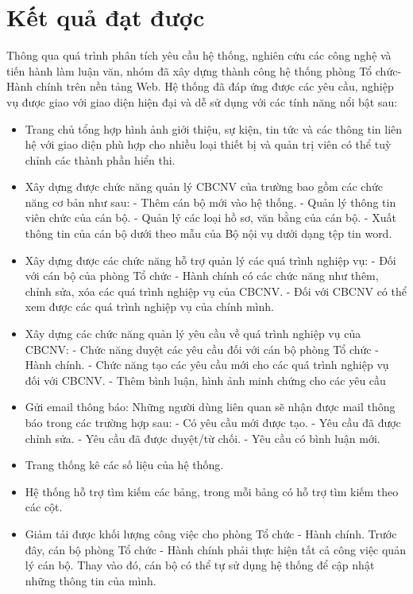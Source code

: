 \section{Kết quả đạt được}
Thông qua quá trình phân tích yêu cầu hệ thống, nghiên cứu các công nghệ và tiến hành làm luận văn, nhóm đã xây dựng thành công hệ thống phòng Tổ chức-Hành chính trên nền tảng Web. Hệ thống đã đáp ứng được các yêu cầu, nghiệp vụ được giao với giao diện hiện đại và dễ sử dụng với các tính năng nổi bật sau:
\begin{itemize}
    \item Trang chủ tổng hợp hình ảnh giới thiệu, sự kiện, tin tức và các thông tin liên hệ với giao diện phù hợp cho nhiều loại thiết bị và quản trị viên có thể tuỳ chỉnh các thành phần hiển thi.
    \item Xây dựng được chức năng quản lý CBCNV của trường bao gồm các chức năng cơ bản như sau:
        \subitem - Thêm cán bộ mới vào hệ thống.
        \subitem - Quản lý thông tin viên chức của cán bộ.
        \subitem - Quản lý các loại hồ sơ, văn bằng của cán bộ.
        \subitem - Xuất thông tin của cán bộ dưới theo mẫu của Bộ nội vụ dưới dạng tệp tin word.
    \item Xây dựng được các chức năng hỗ trợ quản lý các quá trình nghiệp vụ:
        \subitem - Đối với cán bộ của phòng Tổ chức - Hành chính có các chức năng như thêm, chỉnh sửa, xóa các quá trình nghiệp vụ của CBCNV.
        \subitem - Đối với CBCNV có thể xem được các quá trình nghiệp vụ của chính mình.
    \item Xây dựng các chức năng quản lý yêu cầu về quá trình nghiệp vụ của CBCNV:
        \subitem - Chức năng duyệt các yêu cầu đối với cán bộ phòng Tổ chức - Hành chính.
        \subitem - Chức năng tạo các yêu cầu mới cho các quá trình nghiệp vụ đối với CBCNV.
        \subitem - Thêm bình luận, hình ảnh minh chứng cho các yêu cầu
    \item Gửi email thông báo: Những người dùng liên quan sẽ nhận được mail thông báo trong các trường hợp sau:
        \subitem - Có yêu cầu mới được tạo.
        \subitem - Yêu cầu đã được chỉnh sửa.
        \subitem - Yêu cầu đã được duyệt/từ chối.
        \subitem - Yêu cầu có bình luận mới.
    \item Trang thống kê các số liệu của hệ thống.
    \item Hệ thống hỗ trợ tìm kiếm các bảng, trong mỗi bảng có hỗ trợ tìm kiếm theo các cột.
    \item Giảm tải được khối lượng công việc cho phòng Tổ chức - Hành chính. Trước đây, cán bộ phòng Tổ chức - Hành chính phải thực hiện tất cả công việc quản lý cán bộ. Thay vào đó, cán bộ có thể tự sử dụng hệ thống để cập nhật những thông tin của mình.
\end{itemize}
